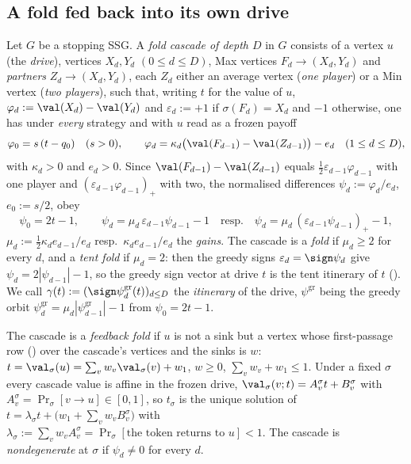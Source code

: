 \subsection{A fold fed back into its own drive}\label{sec:ff}

\begin{definition}\label{def:ff}
Let $G$ be a stopping SSG. A \emph{fold cascade of depth $D$} in $G$ consists of
a vertex $u$ (the \emph{drive}), vertices $X_d,Y_d$ $(0\le d\le D)$, Max vertices
$F_d\to(X_d,Y_d)$ and \emph{partners} $Z_d\to(X_d,Y_d)$, each $Z_d$ either an
average vertex (\emph{one player}) or a Min vertex (\emph{two players}), such
that, writing $t$ for the value of $u$, $\varphi_d:=\val(X_d)-\val(Y_d)$ and
$\varepsilon_d:=+1$ if $\sigma(F_d)=X_d$ and $-1$ otherwise, one has under
\emph{every} strategy and with $u$ read as a frozen payoff
\[
  \varphi_0=s\,(t-q_0)\quad(s>0),\qquad
  \varphi_d=\kappa_d\bigl(\val(F_{d-1})-\val(Z_{d-1})\bigr)-e_d
  \quad(1\le d\le D),
\]
with $\kappa_d>0$ and $e_d>0$. Since $\val(F_{d-1})-\val(Z_{d-1})$ equals
$\tfrac12\varepsilon_{d-1}\varphi_{d-1}$ with one player and
$(\varepsilon_{d-1}\varphi_{d-1})_+$ with two, the normalised differences
$\psi_d:=\varphi_d/e_d$, $e_0:=s/2$, obey
\[
  \psi_0=2t-1,\qquad
  \psi_d=\mu_d\,\varepsilon_{d-1}\psi_{d-1}-1
  \quad\text{resp.}\quad
  \psi_d=\mu_d\,(\varepsilon_{d-1}\psi_{d-1})_+-1,
\]
$\mu_d:=\tfrac12\kappa_de_{d-1}/e_d$ resp.\ $\kappa_de_{d-1}/e_d$ the
\emph{gains}. The cascade is a \emph{fold} if $\mu_d\ge2$ for every $d$, and a
\emph{tent fold} if $\mu_d=2$: then the greedy signs
$\varepsilon_d=\sign\psi_d$ give $\psi_d=2|\psi_{d-1}|-1$, so the greedy sign
vector at drive $t$ is the tent itinerary of $t$
(). We call
$\gamma(t):=(\sign\psi^{\mathrm{gr}}_d(t))_{d\le D}$ the \emph{itinerary} of the
drive, $\psi^{\mathrm{gr}}$ being the greedy orbit
$\psi^{\mathrm{gr}}_d=\mu_d|\psi^{\mathrm{gr}}_{d-1}|-1$ from $\psi_0=2t-1$.

The cascade is a \emph{feedback fold} if $u$ is not a sink but a vertex whose
first-passage row () over the cascade's vertices and the
sinks is $w$:
$t=\val_\sigma(u)=\sum_vw_v\val_\sigma(v)+w_1$, $w\ge0$, $\sum_vw_v+w_1\le1$.
Under a fixed $\sigma$ every cascade value is affine in the frozen drive,
$\val_\sigma(v;t)=A^\sigma_vt+B^\sigma_v$ with
$A^\sigma_v=\Pr_\sigma[v\to u]\in[0,1]$, so $t_\sigma$ is the unique solution of
$t=\lambda_\sigma t+\bigl(w_1+\sum_vw_vB^\sigma_v\bigr)$ with
$\lambda_\sigma:=\sum_vw_vA^\sigma_v=\Pr_\sigma[\text{the token returns to }u]<1$.
The cascade is \emph{nondegenerate} at $\sigma$ if $\psi_d\ne0$ for every $d$.
\end{definition}

